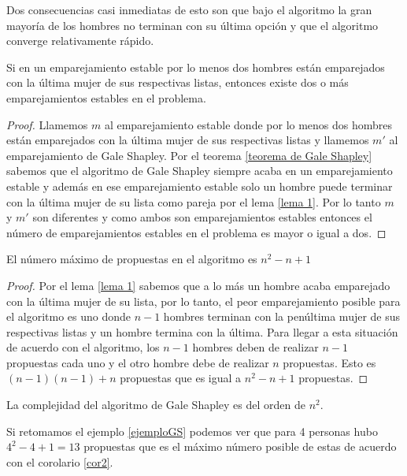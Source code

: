 Dos consecuencias casi inmediatas de esto son que bajo el algoritmo la gran mayoría de los hombres no terminan con su última opción y que el algoritmo converge relativamente rápido. 
\begin{cor}
\label{cor1}
Si en un emparejamiento estable por lo menos dos hombres están emparejados con la última mujer de sus respectivas listas, entonces existe dos o más emparejamientos estables en el problema.
\end{cor}

\begin{proof}
Llamemos $m$ al emparejamiento estable donde por lo menos dos hombres están emparejados con la última mujer de sus respectivas listas y llamemos $m'$ al emparejamiento de Gale Shapley.
Por el teorema \ref{teorema de Gale Shapley} sabemos que el algoritmo de Gale Shapley siempre acaba en un emparejamiento estable y además en ese emparejamiento estable solo un hombre puede terminar con la última mujer de su lista como pareja por el lema \ref{lema 1}.
Por lo tanto $m$ y $m'$ son diferentes y como ambos son emparejamientos estables entonces el número de emparejamientos estables en el problema es mayor o igual a dos. 
\end{proof}

\begin{cor}
\label{cor2}
El número máximo de propuestas en el algoritmo es $n^2-n+1$
\end{cor}

\begin{proof}
Por el lema \ref{lema 1} sabemos que a lo más un hombre acaba emparejado con la última mujer de su lista, por lo tanto, el peor emparejamiento posible para el algoritmo es uno donde $n-1$ hombres terminan con la penúltima mujer de sus respectivas listas y un hombre termina con la última. Para llegar a esta situación de acuerdo con el algoritmo, los $n-1$ hombres deben de realizar $n-1$ propuestas cada uno y el otro hombre debe de realizar $n$ propuestas. Esto es $(n-1)(n-1)+n$ propuestas que es igual a $n^2-n+1$ propuestas.
\end{proof}

\begin{obs}
\label{complejidad1}
La complejidad del algoritmo de Gale Shapley es del orden de $n^2$.
\end{obs}

\begin{eje}
Si retomamos el ejemplo \ref{ejemploGS} podemos ver que para 4 personas hubo $4^{2}-4+1=13$ propuestas que es el máximo número posible de estas de acuerdo con el corolario \ref{cor2}.
\fin
\end{eje}

